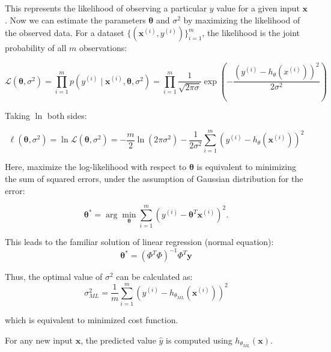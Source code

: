 This represents the likelihood of observing a particular \(y\) value for a given input \(\mathbf{x}\). Now we can estimate the parameters \(\boldsymbol{\theta}\) and \(\sigma^2\) by maximizing the likelihood of the
observed data. For a dataset \(\{(\mathbf{x}^{(i)}, y^{(i)})\}_{i=1}^m\), the likelihood is the joint probability of all $m$ observations:

\begin{equation}
    \mathcal{L}(\boldsymbol{\theta}, \sigma^2) = \prod_{i=1}^m p(y^{(i)} \mid \mathbf{x}^{(i)}, \boldsymbol{\theta}, \sigma^2)
    = \prod_{i=1}^m \frac{1}{\sqrt{2 \pi \sigma}} \exp\left(-\frac{\left(y^{(i)} - h_\theta\left(x^{(i)}\right)\right)^2}{2 \sigma^2}\right)
\end{equation}

Taking $\ln$ both sides:

\begin{equation}
    \ell(\boldsymbol{\theta}, \sigma^2) = \ln \mathcal{L}(\boldsymbol{\theta}, \sigma^2)
= -\frac{m}{2} \ln(2\pi\sigma^2) - \frac{1}{2\sigma^2} \sum_{i=1}^m \left( y^{(i)} - h_\theta\left(\mathbf{x}^{(i)}\right) \right)^2
\end{equation}

Here, maximize the log-likelihood with respect to \(\boldsymbol{\theta}\) is equivalent to minimizing the sum of squared
errors, under the assumption of Gaussian distribution for the error:

\begin{equation}
    \boldsymbol{\theta}^* = \arg\min_{\boldsymbol{\theta}} \sum_{i=1}^m \left( y^{(i)} - \boldsymbol{\theta}^T \mathbf{x}^{(i)} \right)^2.
\end{equation}

This leads to the familiar solution of linear regression (normal equation):
\begin{equation}
    \boldsymbol{\theta}^* = (\Phi^T \Phi)^{-1} \Phi^T \mathbf{y}
\end{equation}

Thus, the optimal value of $\sigma^2$ can be calculated as:
\begin{equation}
    \sigma^2_{ML} = \frac{1}{m} \sum_{i=1}^m \left( y^{(i)} - h_{\theta_{ML}}\left(\mathbf{x}^{(i)}\right) \right)^2
\end{equation}

which is equivalent to minimized cost function.

For any new input \(\mathbf{x}\), the predicted value \(\hat{y}\) is computed using \(h_{\theta_{ML}}(\mathbf{x})\).